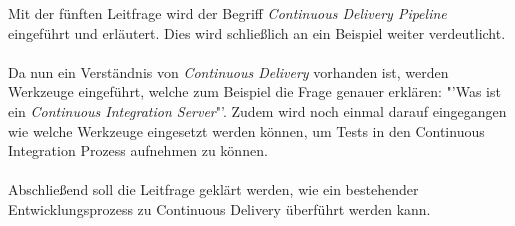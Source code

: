 Mit der fünften Leitfrage wird der Begriff \textit{Continuous Delivery Pipeline} eingeführt und erläutert. Dies wird schließlich an ein Beispiel weiter verdeutlicht.\\\\
Da nun ein Verständnis von \textit{Continuous Delivery} vorhanden ist, werden Werkzeuge eingeführt, welche zum Beispiel die Frage genauer erklären: "'Was ist ein \textit{Continuous Integration Server}"'. Zudem wird noch einmal darauf eingegangen wie welche Werkzeuge eingesetzt werden können, um Tests in den Continuous Integration Prozess aufnehmen zu können.\\\\
Abschließend soll die Leitfrage geklärt werden, wie ein bestehender Entwicklungsprozess zu Continuous Delivery überführt werden kann.


